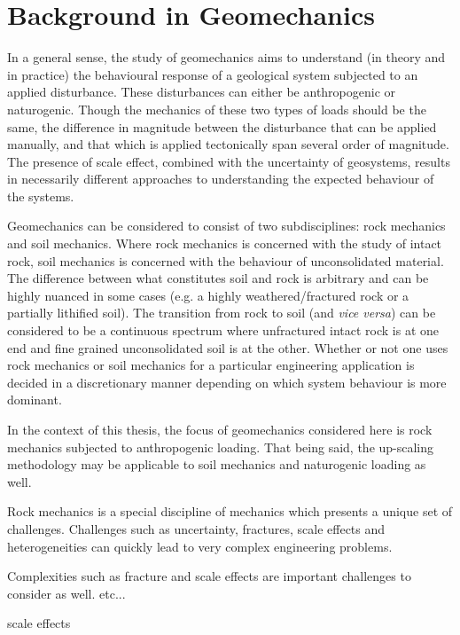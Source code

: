 \chapter{Background in Geomechanics}
In a general sense, the study of geomechanics aims to understand (in theory and in practice) the behavioural response of a geological system subjected to an applied disturbance. These disturbances can either be anthropogenic or naturogenic. Though the mechanics of these two types of loads should be the same, the difference in magnitude between the disturbance that can be applied manually, and that which is applied tectonically span several order of magnitude. The presence of scale effect, combined with the uncertainty of geosystems, results in necessarily different approaches to understanding the expected behaviour of the systems. 

Geomechanics can be considered to consist of two subdisciplines: rock mechanics and soil mechanics. Where rock mechanics is concerned with the study of intact rock, soil mechanics is concerned with the behaviour of unconsolidated material. The difference between what constitutes soil and rock is arbitrary and can be highly nuanced in some cases (e.g. a highly weathered/fractured rock or a partially lithified soil). The transition from rock to soil (and \textit{vice versa}) can be considered to be a continuous spectrum where unfractured intact rock is at one end and fine grained unconsolidated soil is at the other. Whether or not one uses rock mechanics or soil mechanics for a particular engineering application is decided in a discretionary manner depending on which system behaviour is more dominant.

In the context of this thesis, the focus of geomechanics considered here is rock mechanics subjected to anthropogenic loading. That being said, the up-scaling methodology may be applicable to soil mechanics and naturogenic loading as well.  

Rock mechanics is a special discipline of mechanics which presents a unique set of challenges. Challenges such as uncertainty, fractures, scale effects and heterogeneities can quickly lead to very complex engineering problems. 

Complexities such as fracture and scale effects are important challenges to consider as well. etc...\

scale effects

